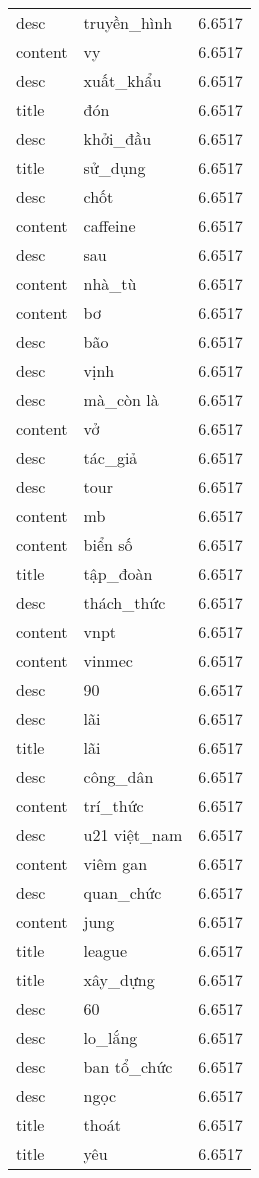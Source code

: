 \documentclass{article}
\begin{document}
\begin{tabular}{lll}
desc & truyền\_hình & 6.6517\\
content & vy & 6.6517\\
desc & xuất\_khẩu & 6.6517\\
title & đón & 6.6517\\
desc & khởi\_đầu & 6.6517\\
title & sử\_dụng & 6.6517\\
desc & chốt & 6.6517\\
content & caffeine & 6.6517\\
desc & sau & 6.6517\\
content & nhà\_tù & 6.6517\\
content & bơ & 6.6517\\
desc & bão & 6.6517\\
desc & vịnh & 6.6517\\
desc & mà\_còn là & 6.6517\\
content & vở & 6.6517\\
desc & tác\_giả & 6.6517\\
desc & tour & 6.6517\\
content & mb & 6.6517\\
content & biển số & 6.6517\\
title & tập\_đoàn & 6.6517\\
desc & thách\_thức & 6.6517\\
content & vnpt & 6.6517\\
content & vinmec & 6.6517\\
desc & 90 & 6.6517\\
desc & lãi & 6.6517\\
title & lãi & 6.6517\\
desc & công\_dân & 6.6517\\
content & trí\_thức & 6.6517\\
desc & u21 việt\_nam & 6.6517\\
content & viêm gan & 6.6517\\
desc & quan\_chức & 6.6517\\
content & jung & 6.6517\\
title & league & 6.6517\\
title & xây\_dựng & 6.6517\\
desc & 60 & 6.6517\\
desc & lo\_lắng & 6.6517\\
desc & ban tổ\_chức & 6.6517\\
desc & ngọc & 6.6517\\
title & thoát & 6.6517\\
title & yêu & 6.6517\\

\end{tabular}
\end{document}
